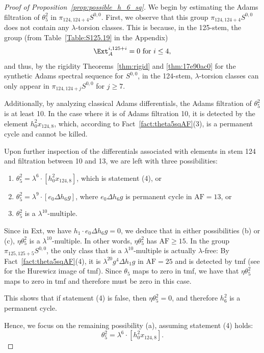 \documentclass{amsart}
\numberwithin{equation}{section}
\newcommand{\AF}{\mathrm{AF}}
\begin{document}
\begin{proof}[Proof of Proposition~\ref{prop:possible_h_6_sq}]
We begin by estimating the Adams filtration of $\theta_5^2$ in   $\pi_{124,124+4} S^{0,0}$. First, we observe that this group  $\pi_{124,124+4} S^{0,0}$ does not contain any $\lambda$-torsion classes. 
This is because, in the 125-stem, the group (from Table~\ref{Table:S125.19} in the Appendix) 
$$\Ext_A^{i,125+i} = 0 \ \text{for} \ i\leq 4,$$ 
and thus, by the rigidity Theorems~\ref{thm:rigid} and \ref{thm:17e90ac0} for the synthetic Adams spectral sequence for $S^{0,0}$, in the 124-stem, $\lambda$-torsion classes can only appear in $\pi_{124,124+j} S^{0,0}$ for $j \geq 7$.

Additionally, by analyzing classical Adams differentials, the Adams filtration of $\theta_5^2$ is at least 10. In the case where it is of Adams filtration 10, it is detected by the element $h_0^2 x_{124,8}$, which, according to Fact~\ref{fact:theta5sqAF}(3), is a permanent cycle and cannot be killed. 

Upon further inspection of the differentials associated with elements in stem 124 and filtration between 10 and 13, we are left with three possibilities:
\begin{enumerate}[label=(\alph*)]
    \item $\theta_5^2 = \lambda^6 \cdot [h_0^2 x_{124,8}]$, which is statement (4), or
    \item $\theta_5^2 = \lambda^9 \cdot [e_0 \Delta h_6 g]$, where $e_0 \Delta h_6 g$ is permanent cycle in $\AF=13$, or
    \item $\theta_5^2$ is a $\lambda^{10}$-multiple.
\end{enumerate}

Since in Ext, we have $h_1 \cdot e_0 \Delta h_6 g = 0$, we deduce that in either possibilities (b) or (c), $\eta \theta_5^2$ is a $\lambda^{10}$-multiple. In other words, $\eta \theta_5^2$ has $\AF \ge 15$. In the group $\pi_{125,125+5} S^{0,0}$, the only class that is a $\lambda^{10}$-multiple is actually $\lambda$-free: By Fact~\ref{fact:theta5sqAF}(4), it is $\lambda^{20} g^4 \Delta h_1 g$ in $\AF=25$ and is detected by tmf (see \cite{tmf} for the Hurewicz image of tmf). Since $\theta_5$ maps to zero in tmf, we have that $\eta \theta_5^2$ maps to zero in tmf and therefore must be zero in this case. 

This shows that if statement (4) is false, then $\eta \theta_5^2 = 0$, and therefore $h_6^2$ is a permanent cycle.

Hence, we focus on the remaining possibility (a), assuming statement (4) holds:
$$\theta_5^2 = \lambda^6 \cdot [h_0^2 x_{124,8}].$$


\end{proof}
\end{document}
